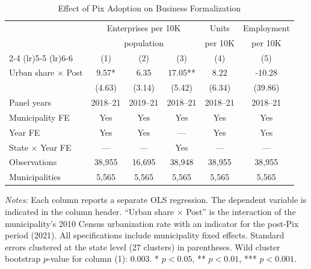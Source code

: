 \begin{table}[htbp]
\centering
\caption{Effect of Pix Adoption on Business Formalization}
\label{tab:main}
\begin{tabular}{lccccc}
\toprule
 & \multicolumn{3}{c}{Enterprises per 10K} & Units & Employment \\
 & \multicolumn{3}{c}{population} & per 10K & per 10K \\
\cmidrule(lr){2-4} \cmidrule(lr){5-5} \cmidrule(lr){6-6}
 & (1) & (2) & (3) & (4) & (5) \\
\midrule
Urban share $\times$ Post & 9.57* & 6.35 & 17.05** & 8.22 & -10.28 \\
 & (4.63) & (3.14) & (5.42) & (6.34) & (39.86) \\
\midrule
Panel years & 2018--21 & 2019--21 & 2018--21 & 2018--21 & 2018--21 \\
Municipality FE & Yes & Yes & Yes & Yes & Yes \\
Year FE & Yes & Yes & --- & Yes & Yes \\
State $\times$ Year FE & --- & --- & Yes & --- & --- \\
Observations & 38,955 & 16,695 & 38,948 & 38,955 & 38,955 \\
Municipalities & 5,565 & 5,565 & 5,565 & 5,565 & 5,565 \\
\bottomrule
\end{tabular}
\begin{tablenotes}
\item \textit{Notes:} Each column reports a separate OLS regression. The dependent variable is indicated in the column header. ``Urban share $\times$ Post'' is the interaction of the municipality's 2010 Census urbanization rate with an indicator for the post-Pix period (2021). All specifications include municipality fixed effects. Standard errors clustered at the state level (27 clusters) in parentheses. Wild cluster bootstrap $p$-value for column (1): 0.003. * $p < 0.05$, ** $p < 0.01$, *** $p < 0.001$.
\end{tablenotes}
\end{table}
